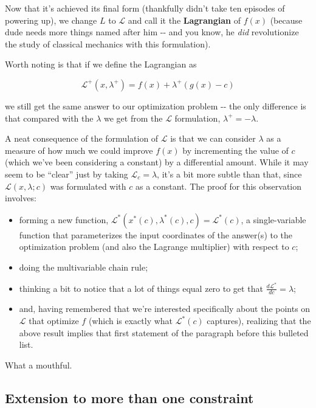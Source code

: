 \documentclass[letterpaper,12pt]{report}
\providecommand{\tightlist}{%
  \setlength{\itemsep}{0pt}\setlength{\parskip}{0pt}}
\begin{document}
Now that it's achieved its final form (thankfully didn't take ten
episodes of powering up), we change \(L\) to \(\mathcal{L}\) and call it
the \textbf{Lagrangian} 
of \(f(x)\) (because dude needs more things
named after him -\/- and you know, he \emph{did} revolutionize the study
of classical mechanics with this formulation).

Worth noting is that if we define the Lagrangian as

\[ \mathcal{L^+}(x, \lambda ^+) = f(x) + \lambda^+\left(g(x) - c\right) \]

we still get the same answer to our optimization problem -\/- the only
difference is that compared with the \(\lambda\) we get from the
\(\mathcal{L}\) formulation, \(\lambda ^+ = - \lambda\).

A neat consequence of the formulation of \(\mathcal{L}\) is that we can
consider \(\lambda\) as a measure of how much we could improve \(f(x)\)
by incrementing the value of \(c\) (which we've been considering a
constant) by a differential amount. While it may seem to be ``clear'' just
by taking \(\mathcal{L}_c = \lambda\), it's a bit more subtle than that,
since \(\mathcal{L}(x, \lambda; c)\) was formulated with \(c\) as a
constant. The proof for this observation involves:

\begin{itemize}
\tightlist
\item
  forming a new function,
  \(\mathcal{L}^*(x^*(c), \lambda ^*(c), c) = \mathcal{L}^*(c)\), a
  single-variable function that parameterizes the input coordinates of
  the answer(s) to the optimization problem (and also the Lagrange
  multiplier) with respect to \(c\);
\item
  doing the multivariable chain rule;
\item
  thinking a bit to notice that a lot of things equal zero to get that
  \(\frac{d\mathcal{L}^*}{dc} = \lambda \);
\item
  and, having remembered that we're interested specifically about the
  points on \(\mathcal{L}\) that optimize \(f\) (which is exactly what
  \(\mathcal{L}^*(c)\) captures), realizing that the above result
  implies that first statement of the paragraph before this bulleted
  list.
\end{itemize}

What a mouthful.

\subsection{Extension to more than one
constraint}\label{extension-to-more-than-one-constraint}
\end{document}
